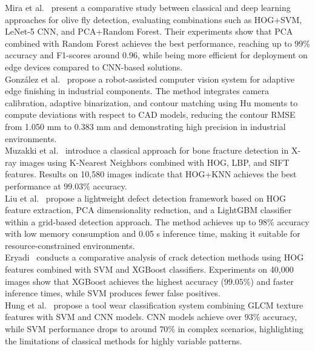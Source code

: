 \documentclass[11pt]{article}
\begin{document}
Mira et al.~\cite{Mira2024} present a comparative study between classical and
deep learning approaches for olive fly detection, evaluating combinations such as
HOG+SVM, LeNet-5 CNN, and PCA+Random Forest. Their experiments show that PCA
combined with Random Forest achieves the best performance, reaching up to $99\%$
accuracy and F1-scores around 0.96, while being more efficient for deployment on
edge devices compared to CNN-based solutions.\\

González et al.~\cite{Gonzalez2024} propose a robot-assisted computer vision
system for adaptive edge finishing in industrial components. The method integrates
camera calibration, adaptive binarization, and contour matching using Hu moments
to compute deviations with respect to CAD models, reducing the contour RMSE from
1.050 mm to 0.383 mm and demonstrating high precision in industrial environments.\\

Muzakki et al.~\cite{Muzakki2025} introduce a classical approach for bone
fracture detection in X-ray images using K-Nearest Neighbors combined with HOG,
LBP, and SIFT features. Results on 10,580 images indicate that HOG+KNN achieves
the best performance at $99.03\%$ accuracy.\\

Liu et al.~\cite{Liu2024a} propose a lightweight defect detection framework based
on HOG feature extraction, PCA dimensionality reduction, and a LightGBM classifier
within a grid-based detection approach. The method achieves up to $98\%$ accuracy
with low memory consumption and 0.05 s inference time, making it suitable for
resource-constrained environments.\\

Eryadi~\cite{Eryadi2025} conducts a comparative analysis of crack detection
methods using HOG features combined with SVM and XGBoost classifiers. Experiments
on 40,000 images show that XGBoost achieves the highest accuracy ($99.05\%$) and
faster inference times, while SVM produces fewer false positives.\\

Hung et al.~\cite{Hung2024} propose a tool wear classification system combining
GLCM texture features with SVM and CNN models. CNN models achieve over $93\%$
accuracy, while SVM performance drops to around $70\%$ in complex scenarios,
highlighting the limitations of classical methods for highly variable patterns.\\
\end{document}
